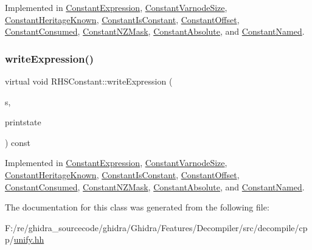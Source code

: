 Implemented in \mbox{\hyperlink{class_constant_expression_a13ee63bd84e93851cb1d756be49cc64d}{Constant\+Expression}}, \mbox{\hyperlink{class_constant_varnode_size_a81d1d954be052fd603005228ff157add}{Constant\+Varnode\+Size}}, \mbox{\hyperlink{class_constant_heritage_known_a700e11fdfe28144dff4f55f05620f7b4}{Constant\+Heritage\+Known}}, \mbox{\hyperlink{class_constant_is_constant_a026e1257509c60e833d289486edae6f0}{Constant\+Is\+Constant}}, \mbox{\hyperlink{class_constant_offset_a6843dd81be2edd35ce23b77f2753c8fe}{Constant\+Offset}}, \mbox{\hyperlink{class_constant_consumed_a20ea358cc8895b5f58a59e9de98474f2}{Constant\+Consumed}}, \mbox{\hyperlink{class_constant_n_z_mask_a25a783d0e2e3c6f48959941fb28a60b6}{Constant\+N\+Z\+Mask}}, \mbox{\hyperlink{class_constant_absolute_ae393b6b03f852d82b28c8bf29ea094c2}{Constant\+Absolute}}, and \mbox{\hyperlink{class_constant_named_a714b8dea21d1d728beb39909a7e40324}{Constant\+Named}}.

\mbox{\label{class_r_h_s_constant_a79e03c6da5320e24873a4fee25f91411}} 
\subsubsection{\texorpdfstring{writeExpression()}{writeExpression()}}
{\footnotesize\ttfamily virtual void R\+H\+S\+Constant\+::write\+Expression (\begin{DoxyParamCaption}\item[{ostream \&}]{s,  }\item[{\mbox{\hyperlink{class_unify_c_printer}{Unify\+C\+Printer}} \&}]{printstate }\end{DoxyParamCaption}) const\hspace{0.3cm}{\ttfamily [pure virtual]}}



Implemented in \mbox{\hyperlink{class_constant_expression_a11af0fadc7f85c3a09431ef92e788870}{Constant\+Expression}}, \mbox{\hyperlink{class_constant_varnode_size_a9541e1f66f85b1ae4f333fb45daa1b02}{Constant\+Varnode\+Size}}, \mbox{\hyperlink{class_constant_heritage_known_a52ea0bf86bff79609c576a29a523660a}{Constant\+Heritage\+Known}}, \mbox{\hyperlink{class_constant_is_constant_ac547445e4235052567994b48c632202f}{Constant\+Is\+Constant}}, \mbox{\hyperlink{class_constant_offset_ab23c0e4200af433aa78092db6488f727}{Constant\+Offset}}, \mbox{\hyperlink{class_constant_consumed_a5c8df9f2bf40e042610b157d5a15f3c0}{Constant\+Consumed}}, \mbox{\hyperlink{class_constant_n_z_mask_a6a9514b0783ac757d8b25c93d543407e}{Constant\+N\+Z\+Mask}}, \mbox{\hyperlink{class_constant_absolute_a137b56bbc65f682cefb1b997dd993dc8}{Constant\+Absolute}}, and \mbox{\hyperlink{class_constant_named_afb9ee047f745a300c7bfa84735857211}{Constant\+Named}}.



The documentation for this class was generated from the following file\+:\begin{DoxyCompactItemize}
\item 
F\+:/re/ghidra\+\_\+sourcecode/ghidra/\+Ghidra/\+Features/\+Decompiler/src/decompile/cpp/\mbox{\hyperlink{unify_8hh}{unify.\+hh}}\end{DoxyCompactItemize}
